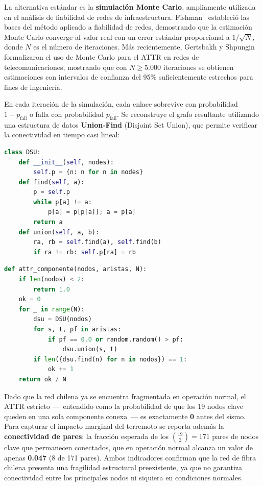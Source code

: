 \documentclass[12pt,a4paper]{article}
\begin{document}
La alternativa estándar es la \textbf{simulación Monte Carlo}, ampliamente
utilizada en el análisis de fiabilidad de redes de infraestructura.
Fishman~\cite{fishman1986} estableció las bases del método aplicado a
fiabilidad de redes, demostrando que la estimación Monte Carlo converge al
valor real con un error estándar proporcional a $1/\sqrt{N}$, donde $N$ es
el número de iteraciones.  Más recientemente, Gertsbakh y
Shpungin~\cite{gertsbakh2010} formalizaron el uso de Monte Carlo para el
ATTR en redes de telecomunicaciones, mostrando que con $N \geq 5.000$
iteraciones se obtienen estimaciones con intervalos de confianza del 95\%
suficientemente estrechos para fines de ingeniería.

En cada iteración de la simulación, cada enlace sobrevive con probabilidad
$1 - p_{\text{fail}}$ o falla con probabilidad $p_{\text{fail}}$.  Se
reconstruye el grafo resultante utilizando una estructura de datos
\textbf{Union-Find} (Disjoint Set Union), que permite verificar la
conectividad en tiempo casi lineal:

\begin{lstlisting}[language=Python,caption={Estructura Union-Find para ATTR (attr.py)}]
class DSU:
    def __init__(self, nodes):
        self.p = {n: n for n in nodes}
    def find(self, a):
        p = self.p
        while p[a] != a:
            p[a] = p[p[a]]; a = p[a]
        return a
    def union(self, a, b):
        ra, rb = self.find(a), self.find(b)
        if ra != rb: self.p[ra] = rb
\end{lstlisting}

\begin{lstlisting}[language=Python,caption={Simulación Monte Carlo del ATTR por componente (attr.py)}]
def attr_componente(nodos, aristas, N):
    if len(nodos) < 2:
        return 1.0
    ok = 0
    for _ in range(N):
        dsu = DSU(nodos)
        for s, t, pf in aristas:
            if pf == 0.0 or random.random() > pf:
                dsu.union(s, t)
        if len({dsu.find(n) for n in nodos}) == 1:
            ok += 1
    return ok / N
\end{lstlisting}

Dado que la red chilena ya se encuentra fragmentada en operación normal,
el ATTR estricto ---~entendido como la probabilidad de que los 19 nodos
clave queden en una sola componente conexa~--- es exactamente \textbf{0}
antes del sismo.  Para capturar el impacto marginal del terremoto se
reporta además la \textbf{conectividad de pares}: la fracción esperada de
los $\binom{19}{2} = 171$ pares de nodos clave que permanecen conectados,
que en operación normal alcanza un valor de apenas \textbf{0.047} (8 de
171 pares).  Ambos indicadores confirman que la red de fibra chilena
presenta una fragilidad estructural preexistente, ya que no garantiza
conectividad entre los principales nodos ni siquiera en condiciones
normales.
\end{document}
